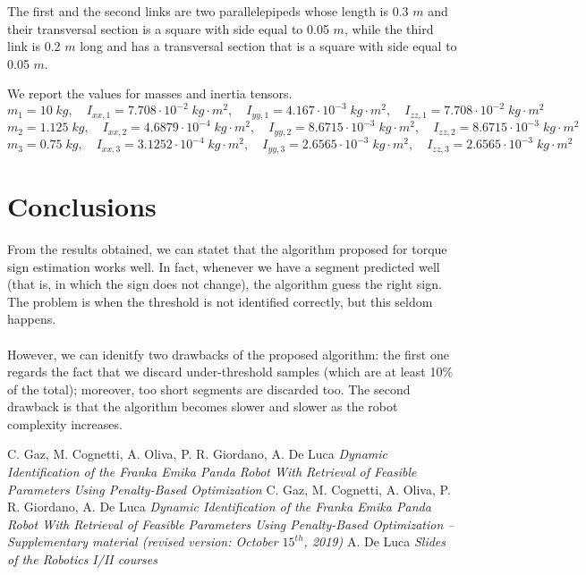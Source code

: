 \documentclass{article}
\begin{document}
The first and the second links are two parallelepipeds whose length is 0.3 $m$ and their transversal section is a square with side equal to 0.05 $m$, while the third link is 0.2 $m$ long and has a transversal section that is a square with side equal to 0.05 $m$.

We report the  values for masses and inertia tensors.
\[m_1 = 10 \;kg,\quad I_{xx,1} = 7.708\cdot 10^{-2}\;kg\cdot m^2,\quad I_{yy,1} = 4.167 \cdot 10^{-3}\;kg\cdot m^2,\quad I_{zz,1} = 7.708\cdot 10^{-2}\;kg\cdot m^2\]
\[ m_2 = 1.125\;kg,\quad I_{xx,2} = 4.6879\cdot10^{-4}\;kg\cdot m^2,\quad I_{yy,2} = 8.6715\cdot 10^{-3}\;kg\cdot m^2,\quad I_{zz,2} = 8.6715\cdot 10^{-3}\;kg\cdot m^2\]
\[m_3 = 0.75\;kg,\quad I_{xx,3} = 3.1252\cdot 10^{-4}\;kg\cdot m^2,\quad I_{yy,3} = 2.6565\cdot 10^{-3}\;kg\cdot m^2,\quad I_{zz,3} = 2.6565\cdot 10^{-3}\;kg\cdot m^2\]

\section{Conclusions}
From the results obtained, we can statet that the algorithm proposed for torque sign estimation works well. In fact, whenever we have a segment predicted well (that is, in which the sign does not change), the algorithm guess the right  sign. The problem is when the threshold is not identified correctly, but this seldom happens. \\\\

However, we can idenitfy two drawbacks of the proposed algorithm: the first one regards the fact that we discard under-threshold samples (which are at least 10\% of the total); moreover, too short segments are discarded too. The second drawback is that the algorithm becomes slower and slower as the robot complexity increases.
\clearpage

\begin{thebibliography}{}
C. Gaz, M. Cognetti, A. Oliva, P. R. Giordano, A. De Luca
\emph {Dynamic Identification of the Franka Emika Panda Robot With Retrieval of Feasible Parameters Using Penalty-Based Optimization}
C. Gaz, M. Cognetti, A. Oliva, P. R. Giordano, A. De Luca
\emph {Dynamic Identification of the Franka Emika Panda Robot With Retrieval of Feasible Parameters Using Penalty-Based Optimization – Supplementary material (revised version: October $15^{th}$, 2019)}
A. De Luca
\emph {Slides of the Robotics I/II courses}
\end{thebibliography}
\end{document}
